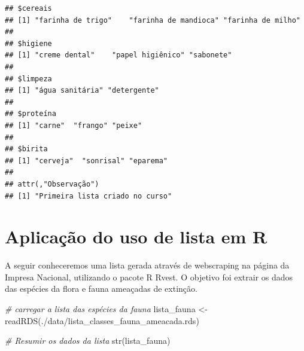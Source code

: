 \documentclass[
]{article}
\newenvironment{Shaded}{\begin{snugshade}}{\end{snugshade}}
\newcommand{\CommentTok}[1]{\textcolor[rgb]{0.56,0.35,0.01}{\textit{#1}}}
\newcommand{\FunctionTok}[1]{\textcolor[rgb]{0.00,0.00,0.00}{#1}}
\newcommand{\NormalTok}[1]{#1}
\newcommand{\OtherTok}[1]{\textcolor[rgb]{0.56,0.35,0.01}{#1}}
\newcommand{\SpecialCharTok}[1]{\textcolor[rgb]{0.00,0.00,0.00}{#1}}
\newcommand{\StringTok}[1]{\textcolor[rgb]{0.31,0.60,0.02}{#1}}
\begin{document}
\begin{Shaded}
\end{Shaded}

\begin{verbatim}
## $cereais
## [1] "farinha de trigo"    "farinha de mandioca" "farinha de milho"   
## 
## $higiene
## [1] "creme dental"    "papel higiênico" "sabonete"       
## 
## $limpeza
## [1] "água sanitária" "detergente"    
## 
## $proteína
## [1] "carne"  "frango" "peixe" 
## 
## $birita
## [1] "cerveja"  "sonrisal" "eparema" 
## 
## attr(,"Observação")
## [1] "Primeira lista criado no curso"
\end{verbatim}

\hypertarget{aplicauxe7uxe3o-do-uso-de-lista-em-r}{%
\section{Aplicação do uso de lista em
R}\label{aplicauxe7uxe3o-do-uso-de-lista-em-r}}

A seguir conheceremos uma lista gerada através de webscraping na página
da Impresa Nacional, utilizando o pacote R Rvest. O objetivo foi extrair
os dados das espécies da flora e fauna ameaçadas de extinção.

\begin{Shaded}
\begin{Highlighting}[]
\CommentTok{\# carregar a lista das espécies da fauna}
\NormalTok{lista\_fauna }\OtherTok{\textless{}{-}} \FunctionTok{readRDS}\NormalTok{(}\StringTok{\textquotesingle{}./data/lista\_classes\_fauna\_ameacada.rds\textquotesingle{}}\NormalTok{)}

\CommentTok{\# Resumir os dados da lista}
\FunctionTok{str}\NormalTok{(lista\_fauna)}
\end{Highlighting}
\end{Shaded}
\end{document}
